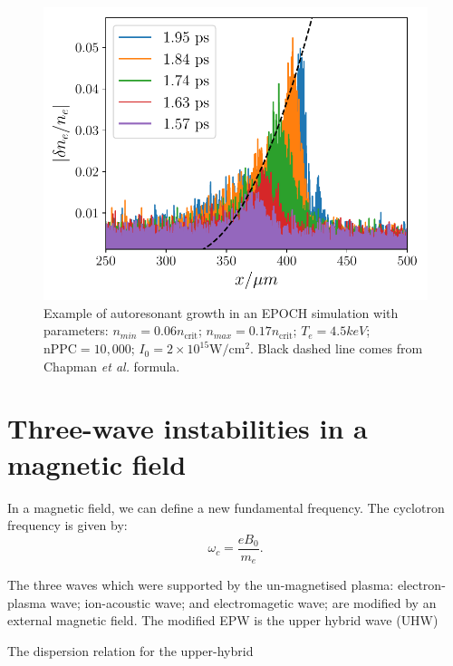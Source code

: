 \begin{figure}[ht]
    \centering
    \includegraphics[width=0.8\columnwidth]{Chapters/C2_Theory/AR_diagnostic.pdf}
    \caption{Example of autoresonant growth in an EPOCH simulation with parameters: $n_{min} = 0.06 n_{\text{crit}}$; $n_{max} = 0.17 n_{\text{crit}}$; $T_e = 4.5\si{keV}$; $\text{nPPC}=10,000$; $I_0 = 2 \times 10^{15}\si{\watt / \centi\metre^2}$. Black dashed line comes from Chapman \textit{et al.} \citep{Chapman2012} formula.}
    \label{fig:AR_diagnostic}
\end{figure}{}



\section{Three-wave instabilities in a magnetic field}

In a magnetic field, we can define a new fundamental frequency. The cyclotron frequency is given by:
\begin{equation}
\omega_c = \frac{eB_0}{m_e}.
\end{equation}

The three waves which were supported by the un-magnetised plasma: electron-plasma wave; ion-acoustic wave; and electromagetic wave; are modified by an external magnetic field. The modified \acrshort{EPW} is the upper hybrid wave (\acrshort{UHW})

The dispersion relation for the upper-hybrid 

